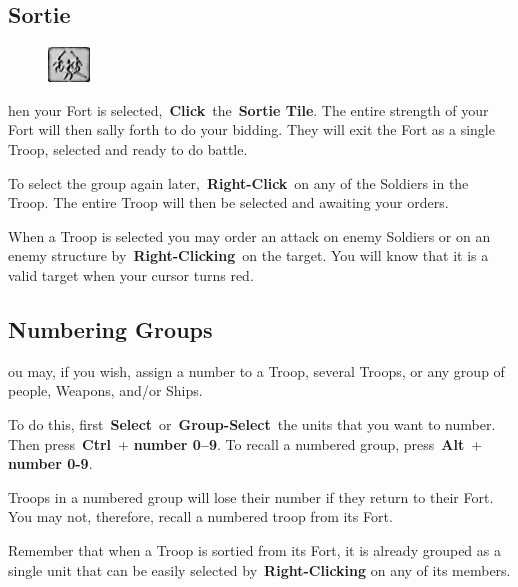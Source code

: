 \subsection{Sortie}


\begin{figure}
	\vspace{-20pt}
	\begin{center}
		\includegraphics[width=0.1\textwidth]{Tsortie}
	\end{center}
	\vspace{-20pt}
\end{figure}

hen your Fort is selected, \textbf{Click} the \textbf{Sortie Tile}. The entire strength of your Fort will then sally forth to do your bidding. They will exit the Fort as a single Troop, selected and ready to do battle.

To select the group again later, \textbf{Right-Click} on any of the Soldiers in the Troop. The entire Troop will then be selected and awaiting your orders.

When a Troop is selected you may order an attack on enemy Soldiers or on an enemy structure by \textbf{Right-Clicking} on the target. You will know that it is a valid target when your cursor turns red.

\subsection{Numbering Groups}


ou may, if you wish, assign a number to a Troop, several Troops, or any group of people, Weapons, and/or Ships.

To do this, first \textbf{Select} or \textbf{Group-Select} the units that you want to number. Then press \textbf{Ctrl} + \textbf{number 0–9}. To recall a numbered group, press \textbf{Alt} + \textbf{number 0-9}.

Troops in a numbered group will lose their number if they return to their Fort. You may not, therefore, recall a numbered troop from its Fort.

Remember that when a Troop is sortied from its Fort, it is already grouped as a single unit that can be easily selected by \textbf{Right-Clicking} on any of its members.

